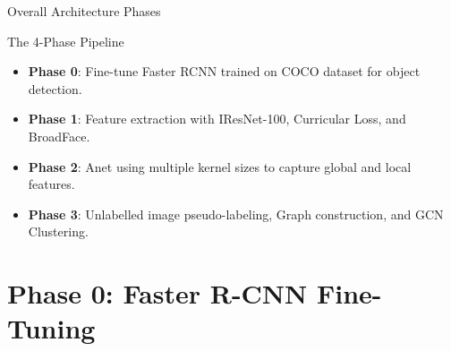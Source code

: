 \documentclass[t]{beamer}
\begin{document}
\begin{frame}{Overall Architecture Phases}
    \begin{block}{The 4-Phase Pipeline}
        \begin{itemize}
            \item \textbf{Phase 0}: Fine-tune Faster RCNN trained on COCO dataset for object detection.
            \item \textbf{Phase 1}: Feature extraction with IResNet-100, Curricular Loss, and BroadFace.
            \item \textbf{Phase 2}: Anet using multiple kernel sizes to capture global and local features.
            \item \textbf{Phase 3}: Unlabelled image pseudo-labeling, Graph construction, and GCN Clustering.
        \end{itemize}
    \end{block}

    \vspace{0.5cm}

    \begin{center}
    \end{center}
\end{frame}

\section{Phase 0: Faster R-CNN Fine-Tuning}
\end{document}
